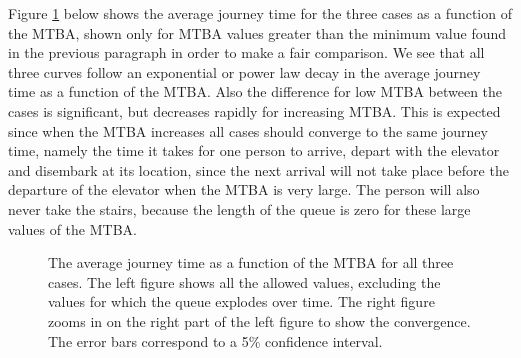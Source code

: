 \documentclass[10pt,a4paper]{article}
\begin{document}
\noindent Figure \ref{fig:journey} below shows the average journey time for the three cases as a function of the MTBA, shown only for MTBA values greater than the minimum value found in the previous paragraph in order to make a fair comparison. We see that all three curves follow an exponential or power law decay in the average journey time as a function of the MTBA. Also the difference for low MTBA between the cases is significant, but decreases rapidly for increasing MTBA. This is expected since when the MTBA increases all cases should converge to the same journey time, namely the time it takes for one person to arrive, depart with the elevator and disembark at its location, since the next arrival will not take place before the departure of the elevator when the MTBA is very large. The person will also never take the stairs, because the length of the queue is zero for these large values of the MTBA.

\begin{figure}[H]
  \caption{The average journey time as a function of the MTBA for all three cases. The left figure shows all the allowed values, excluding the values for which the queue explodes over time. The right figure zooms in on the right part of the left figure to show the convergence. The error bars correspond to a 5\% confidence interval.}
  \label{fig:journey}
\end{figure}
\end{document}
